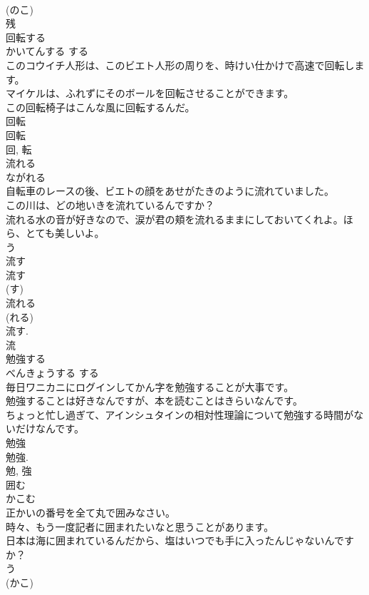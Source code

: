 \documentclass[8pt]{extreport}
\begin{document}
\begin{CJK}{UTF8}{min}
\\	(のこ) 
\\	残	
\\	回転する	
\\	かいてんする	する 
\\	このコウイチ人形は、このビエト人形の周りを、時けい仕かけで高速で回転します。	
\\	マイケルは、ふれずにそのボールを回転させることができます。	
\\	この回転椅子はこんな風に回転するんだ。	
\\	回転 
\\	回転 
\\	回, 転	
\\	流れる	
\\	ながれる	
\\	自転車のレースの後、ビエトの顔をあせがたきのように流れていました。	
\\	この川は、どの地いきを流れているんですか？	
\\	流れる水の音が好きなので、涙が君の頬を流れるままにしておいてくれよ。ほら、とても美しいよ。	
\\	う 
\\	流す 
\\	流す 
\\	(す) 
\\	流れる 
\\	(れる) 
\\	流す. 
\\	流	
\\	勉強する	
\\	べんきょうする	する 
\\	毎日ワニカニにログインしてかん字を勉強することが大事です。	
\\	勉強することは好きなんですが、本を読むことはきらいなんです。	
\\	ちょっと忙し過ぎて、アインシュタインの相対性理論について勉強する時間がないだけなんです。	
\\	勉強 
\\	勉強. 
\\	勉, 強	
\\	囲む	
\\	かこむ	
\\	正かいの番号を全て丸で囲みなさい。	
\\	時々、もう一度記者に囲まれたいなと思うことがあります。	
\\	日本は海に囲まれているんだから、塩はいつでも手に入ったんじゃないんですか？	
\\	う 
\\	(かこ) 

\end{CJK}
\end{document}
